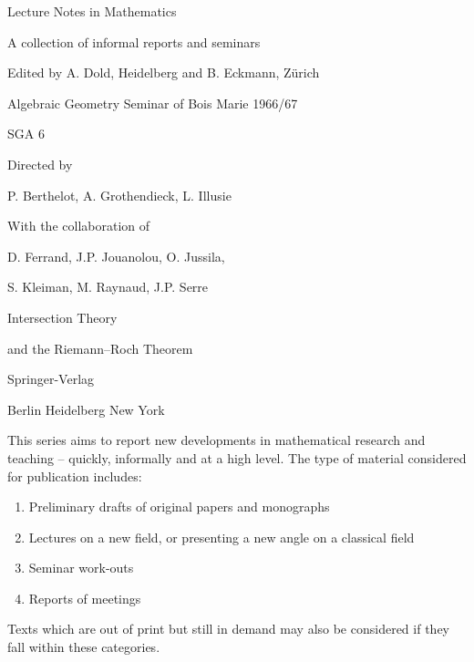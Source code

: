 
%
\begin{center}
{\Large Lecture Notes in Mathematics}\par
A collection of informal reports and seminars\par
Edited by A. Dold, Heidelberg and B. Eckmann, Zürich\par
{}\par
\bigskip
Algebraic Geometry Seminar of Bois Marie 1966/67\par
SGA 6\par
Directed by\par
P. Berthelot, A. Grothendieck, L. Illusie\par
With the collaboration of\par
D. Ferrand, J.P. Jouanolou, O. Jussila,\par
S. Kleiman, M. Raynaud, J.P. Serre\par
\bigskip
{\Large Intersection Theory\par
and the Riemann--Roch Theorem}\par
\bigskip
Springer-Verlag\par
Berlin \textperiodcentered{} Heidelberg \textperiodcentered{} New York
\end{center}

%

This series aims to report new developments in mathematical research and teaching -- quickly, informally
and at a high level. The type of material considered for publication includes:
\begin{enumerate}
\item Preliminary drafts of original papers and monographs
\item Lectures on a new field, or presenting a new angle on a classical field
\item Seminar work-outs
\item Reports of meetings
\end{enumerate}
Texts which are out of print but still in demand may also be considered if they fall within these categories.

